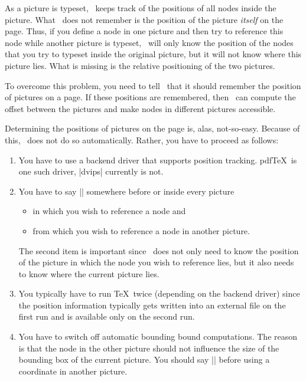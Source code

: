As a picture is typeset, \pgfname\ keeps track of the positions of all
nodes inside the picture. What \pgfname\ does not remember is the
position of the picture \emph{itself} on the page. Thus, if you define
a node in one picture and then try to reference this node while
another picture is typeset, \pgfname\ will only know the position of
the nodes that you try to typeset inside the original picture, but it
will not know where this picture lies. What is missing is the relative
positioning of the two pictures.

To overcome this problem, you need to tell \pgfname\ that it should
remember the position of pictures on a page. If these positions are
remembered, then \pgfname\ can compute the offset between the pictures
and make nodes in different pictures accessible.

Determining the positions of pictures on the page is, alas,
not-so-easy. Because of this, \pgfname\ does not do so
automatically. Rather, you have to proceed as follows:
\begin{enumerate}
\item You have to use a backend driver that supports position
  tracking. pdf\TeX\ is one such driver, |dvips| currently is not.
\item You have to say |\pgfrememberpicturepositiononpagetrue|
  somewhere before or inside every picture
  \begin{itemize}
  \item in which you wish to reference a node and
  \item from which you wish to reference a node in another picture.
  \end{itemize}
  The second item is important since \pgfname\ does not only need to
  know the position of the picture in which the node you wish to
  reference lies, but it also needs to know where the current picture
  lies.
\item You typically have to run \TeX\ twice (depending on the backend
  driver) since the position information typically gets written into
  an external file on the first run and is available only on the
  second run.
\item You have to switch off automatic bounding bound
  computations. The reason is that the node in the other picture
  should not influence the size of the bounding box of the current
  picture. You should say || before
  using a coordinate in another picture.
\end{enumerate}



